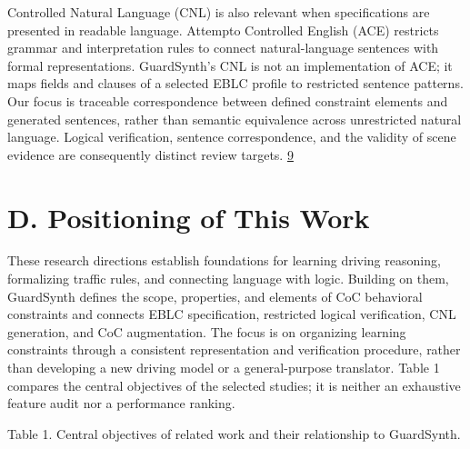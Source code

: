 \documentclass[11pt,a4paper]{article}
\begin{document}
Controlled Natural Language (CNL) is also relevant when specifications are presented in readable language. Attempto Controlled English (ACE) restricts grammar and interpretation rules to connect natural-language sentences with formal representations. GuardSynth's CNL is not an implementation of ACE; it maps fields and clauses of a selected EBLC profile to restricted sentence patterns. Our focus is traceable correspondence between defined constraint elements and generated sentences, rather than semantic equivalence across unrestricted natural language. Logical verification, sentence correspondence, and the validity of scene evidence are consequently distinct review targets. \href{\detokenize{https://attempto.ifi.uzh.ch/site/pubs/papers/FLAIRS0601FuchsN.pdf}}{9}\par

\section*{D. Positioning of This Work}

These research directions establish foundations for learning driving reasoning, formalizing traffic rules, and connecting language with logic. Building on them, GuardSynth defines the scope, properties, and elements of CoC behavioral constraints and connects EBLC specification, restricted logical verification, CNL generation, and CoC augmentation. The focus is on organizing learning constraints through a consistent representation and verification procedure, rather than developing a new driving model or a general-purpose translator. Table 1 compares the central objectives of the selected studies; it is neither an exhaustive feature audit nor a performance ranking.\par

Table 1. Central objectives of related work and their relationship to GuardSynth.\par
\end{document}
